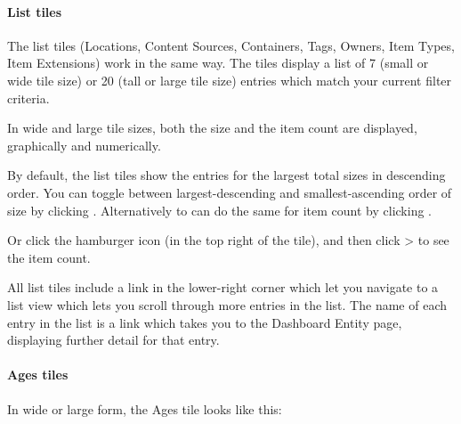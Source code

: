 \documentclass[letterpaper,10pt,english]{sphinxmanual}
\begin{document}
\paragraph{List tiles}
\label{\detokenize{mcdmp_app_ug:list-tiles}}\label{\detokenize{mcdmp_app_ug:list-titles}}
The list tiles (Locations, Content Sources, Containers, Tags, Owners, Item Types, Item Extensions)  work in the same way. The tiles display a list of 7 (small or wide tile size) or 20 (tall or large tile size) entries which match your current filter criteria.

In wide and large tile sizes, both the size and the item count are displayed, graphically and numerically.
\begin{quote}

\begin{figure}[htbp]
\centering

\noindent{}
\end{figure}
\end{quote}

By default, the list tiles show the entries for the largest total sizes in descending order. You can toggle between largest-descending and smallest-ascending order of size by clicking . Alternatively to can do the same for item count by clicking .

Or click the hamburger icon  (in the top right of the tile), and then click  \textgreater{}  to see the item count.
\begin{quote}

\begin{figure}[htbp]
\centering

\noindent{}
\end{figure}
\end{quote}

All list tiles include a link in the lower-right corner which let you navigate to a list view which lets you scroll through more entries in the list. The name of each entry in the list is a link which takes you to the Dashboard Entity page, displaying further detail for that entry.


\paragraph{Ages tiles}
\label{\detokenize{mcdmp_app_ug:ages-tiles}}
In wide or large form, the Ages tile looks like this:
\begin{quote}

\begin{figure}[htbp]
\centering

\noindent{}
\end{figure}
\end{quote}
\end{document}

